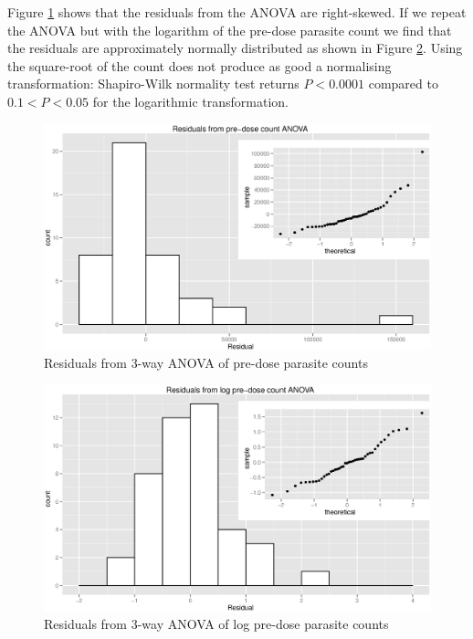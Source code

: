Figure \ref{aovres} shows that the residuals from the ANOVA are right-skewed. If we repeat the ANOVA but with the logarithm of the pre-dose parasite count we find that the residuals are approximately normally distributed as shown in Figure \ref{logaovres}. Using the square-root of the count does not produce as good a normalising transformation: Shapiro-Wilk normality test returns $P<0.0001$ compared to $0.1<P<0.05$ for the logarithmic transformation. 
\begin{figure}[p]
\begin{center}
\includegraphics[width=6.1in]{aovres.eps}
\end{center}
\caption{Residuals from 3-way ANOVA of pre-dose parasite counts}
\label{aovres}
\end{figure} 
\begin{figure}[p]
\begin{center}
\includegraphics[width=6.1in]{logaovres.eps}
\end{center}
\caption{Residuals from 3-way ANOVA of log pre-dose parasite counts}
\label{logaovres}
\end{figure} 
